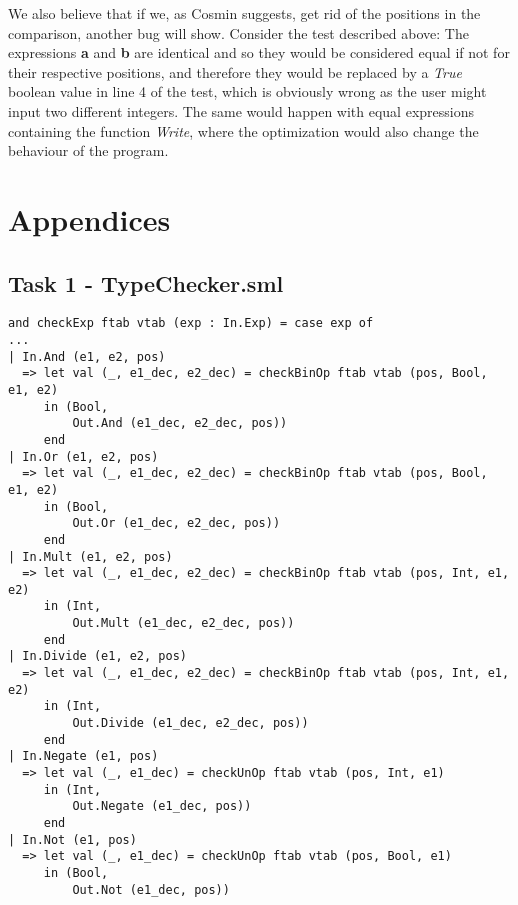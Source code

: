 \documentclass{article}
\begin{document}
We also believe that if we, as Cosmin suggests, get rid of the positions in the comparison, another bug will show.
Consider the test described above: The expressions \textbf{a} and \textbf{b} are identical and so they would be considered equal if not for their respective positions, and therefore they would be replaced by a \textit{True} boolean value in line 4 of the test, which is obviously wrong as the user might input two different integers. The same would happen with equal expressions containing the function \textit{Write}, where the optimization would also change the behaviour of the program.

\newpage

\section{Appendices}

\subsection{Task 1 - TypeChecker.sml}\label{app:1type}

\begin{lstlisting}
and checkExp ftab vtab (exp : In.Exp) = case exp of
...
| In.And (e1, e2, pos)
  => let val (_, e1_dec, e2_dec) = checkBinOp ftab vtab (pos, Bool, e1, e2)
     in (Bool,
         Out.And (e1_dec, e2_dec, pos))
     end
| In.Or (e1, e2, pos)
  => let val (_, e1_dec, e2_dec) = checkBinOp ftab vtab (pos, Bool, e1, e2)
     in (Bool,
         Out.Or (e1_dec, e2_dec, pos))
     end
| In.Mult (e1, e2, pos)
  => let val (_, e1_dec, e2_dec) = checkBinOp ftab vtab (pos, Int, e1, e2)
     in (Int,
         Out.Mult (e1_dec, e2_dec, pos))
     end
| In.Divide (e1, e2, pos)
  => let val (_, e1_dec, e2_dec) = checkBinOp ftab vtab (pos, Int, e1, e2)
     in (Int,
         Out.Divide (e1_dec, e2_dec, pos))
     end
| In.Negate (e1, pos)
  => let val (_, e1_dec) = checkUnOp ftab vtab (pos, Int, e1)
     in (Int,
         Out.Negate (e1_dec, pos))
     end
| In.Not (e1, pos)
  => let val (_, e1_dec) = checkUnOp ftab vtab (pos, Bool, e1)
     in (Bool,
         Out.Not (e1_dec, pos))
\end{lstlisting}
\end{document}
